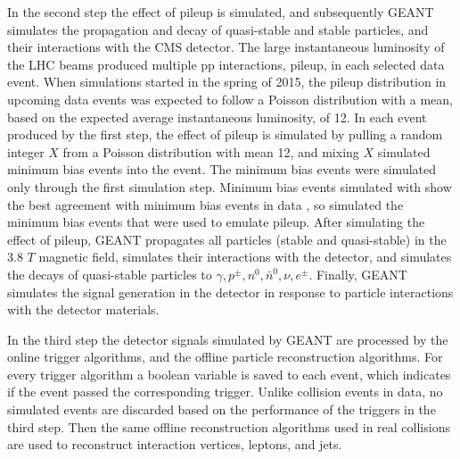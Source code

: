 
In the second step the effect of pileup is simulated, and subsequently GEANT \cite{geant4} simulates the propagation and decay of 
quasi-stable and stable particles, and their interactions with the CMS detector.  The large instantaneous luminosity of the LHC 
beams produced multiple pp interactions, pileup, in each selected data event.  When \MC simulations started in the spring of 2015, 
the pileup distribution in upcoming data events was expected to follow a Poisson distribution with a mean, based on the expected 
average instantaneous luminosity, of 12.  In each event produced by the first step, the effect of pileup is simulated by pulling a 
random integer $X$ from a Poisson distribution with mean 12, and mixing $X$ simulated minimum bias events into the event.  The 
minimum bias events were simulated only through the first simulation step.  Minimum bias events simulated with \PYTHIA show the 
best agreement with minimum bias events in data \cite{pythiaForHadronization}, so \PYTHIA simulated the minimum bias events that 
were used to emulate pileup.  After simulating the effect of pileup, GEANT propagates all particles (stable and quasi-stable) in 
the 3.8 $\unit{T}$ magnetic field, simulates their interactions with the detector, and simulates the decays of quasi-stable particles 
to $\gamma,p^{\pm},n^{0},\bar{n}^{0},\nu,e^{\pm}$.  Finally, GEANT simulates the signal generation in the detector in response to 
particle interactions with the detector materials.

In the third step the detector signals simulated by GEANT are processed by the online trigger algorithms, and the offline particle 
reconstruction algorithms.  For every trigger algorithm a boolean variable is saved to each event, which indicates if the event 
passed the corresponding trigger.  Unlike collision events in data, no simulated events are discarded based on the performance of 
the triggers in the third step.  Then the same offline reconstruction algorithms used in real collisions are used to reconstruct 
interaction vertices, leptons, and jets.

